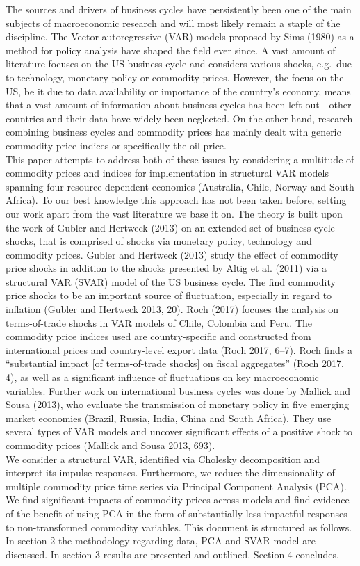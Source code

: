 \documentclass[12pt,]{article}
\begin{document}
The sources and drivers of business cycles have persistently been one of
the main subjects of macroeconomic research and will most likely remain
a staple of the discipline. The Vector autoregressive (VAR) models
proposed by Sims (1980) as a method for policy analysis have shaped the
field ever since. A vast amount of literature focuses on the US business
cycle and considers various shocks, e.g.~due to technology, monetary
policy or commodity prices. However, the focus on the US, be it due to
data availability or importance of the country's economy, means that a
vast amount of information about business cycles has been left out -
other countries and their data have widely been neglected. On the other
hand, research combining business cycles and commodity prices has mainly
dealt with generic commodity price indices or specifically the oil
price.\\
This paper attempts to address both of these issues by considering a
multitude of commodity prices and indices for implementation in
structural VAR models spanning four resource-dependent economies
(Australia, Chile, Norway and South Africa). To our best knowledge this
approach has not been taken before, setting our work apart from the vast
literature we base it on. The theory is built upon the work of Gubler
and Hertweck (2013) on an extended set of business cycle shocks, that is
comprised of shocks via monetary policy, technology and commodity
prices. Gubler and Hertweck (2013) study the effect of commodity price
shocks in addition to the shocks presented by Altig et al. (2011) via a
structural VAR (SVAR) model of the US business cycle. The find commodity
price shocks to be an important source of fluctuation, especially in
regard to inflation (Gubler and Hertweck 2013, 20). Roch (2017) focuses
the analysis on terms-of-trade shocks in VAR models of Chile, Colombia
and Peru. The commodity price indices used are country-specific and
constructed from international prices and country-level export data
(Roch 2017, 6--7). Roch finds a ``substantial impact {[}of
terms-of-trade shocks{]} on fiscal aggregates'' (Roch 2017, 4), as well
as a significant influence of fluctuations on key macroeconomic
variables. Further work on international business cycles was done by
Mallick and Sousa (2013), who evaluate the transmission of monetary
policy in five emerging market economies (Brazil, Russia, India, China
and South Africa). They use several types of VAR models and uncover
significant effects of a positive shock to commodity prices (Mallick and
Sousa 2013, 693).\\
We consider a structural VAR, identified via Cholesky decomposition and
interpret its impulse responses. Furthermore, we reduce the
dimensionality of multiple commodity price time series via Principal
Component Analysis (PCA). We find significant impacts of commodity
prices across models and find evidence of the benefit of using PCA in
the form of substantially less impactful responses to non-transformed
commodity variables. This document is structured as follows. In section
2 the methodology regarding data, PCA and SVAR model are discussed. In
section 3 results are presented and outlined. Section 4 concludes.
\end{document}
